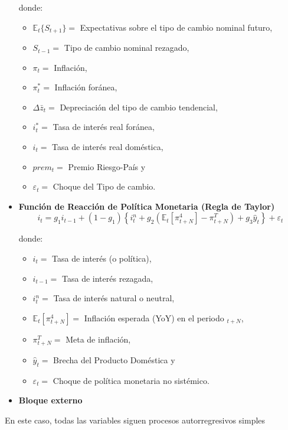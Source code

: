 \documentclass[
]{book}
\begin{document}
\begin{itemize}
  donde:

  \begin{itemize}
  \item
    \(\mathbb{E}_t \{ S_{t+1}\} =\) Expectativas sobre el tipo de cambio nominal futuro,
  \item
    \(S_{t-1} =\) Tipo de cambio nominal rezagado,
  \item
    \(\pi_t =\) Inflación,
  \item
    \(\pi_t^* =\) Inflación foránea,
  \item
    \(\Delta \bar{z}_t =\) Depreciación del tipo de cambio tendencial,
  \item
    \(i_t^* =\) Tasa de interés real foránea,
  \item
    \(i_t =\) Tasa de interés real doméstica,
  \item
    \(prem_t =\) Premio Riesgo-País y
  \item
    \(\varepsilon_t =\) Choque del Tipo de cambio.
  \end{itemize}
\item
  \textbf{Función de Reacción de Política Monetaria (Regla de Taylor)}
  \begin{equation}
  i_t = g_1 i_{t-1} + (1 - g_1) \left\{ i_t^n + g_2 \left( \mathbb{E}_t [\pi_{t+N}^4] - \pi_{t+N}^T \right) + g_3 \hat{y}_t \right\} + \varepsilon_t
  \end{equation}

  donde:

  \begin{itemize}
  \item
    \(i_t =\) Tasa de interés (o política),
  \item
    \(i_{t-1} =\) Tasa de interés rezagada,
  \item
    \(i_t^n =\) Tasa de interés natural o neutral,
  \item
    \(\mathbb{E}_t [\pi_{t+N}^4] =\) Inflación esperada (YoY) en el periodo \(_{t+N}\),
  \item
    \(\pi_{t+N}^T =\) Meta de inflación,
  \item
    \(\hat{y}_t =\) Brecha del Producto Doméstica y
  \item
    \(\varepsilon_t =\) Choque de política monetaria no sistémico.
  \end{itemize}
\item
  \textbf{Bloque externo}
\end{itemize}

En este caso, todas las variables siguen procesos autorregresivos simples
\end{document}
